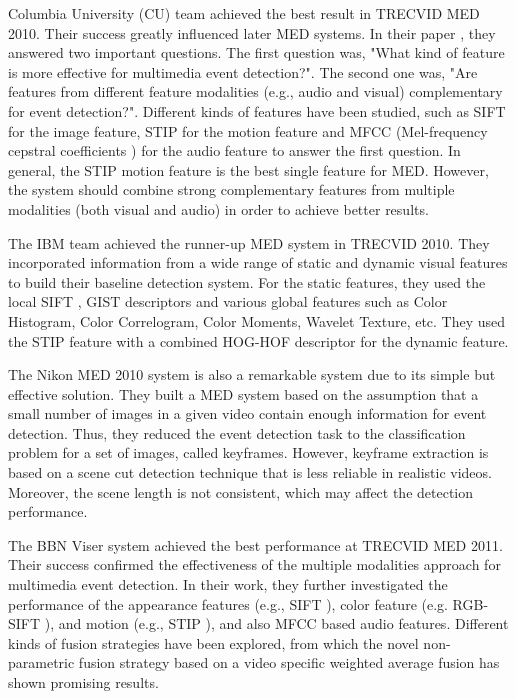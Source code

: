Columbia University (CU) team achieved the best result in TRECVID MED 2010. Their success greatly influenced later MED systems. In their paper \cite{trecvid10:cuucf}, they answered two important questions. The first question was, "What kind of feature is more effective for multimedia event detection?". The second one was, "Are features from different feature modalities (e.g., audio and visual) complementary for event detection?". Different kinds of features have been studied, such as SIFT \cite{lowe2004distinctive} for the image feature, STIP \cite{Laptev:2005:SIP} for the motion feature and MFCC (Mel-frequency cepstral coefficients \cite{Lee1998MFCC}) for the audio feature to answer the first question. In general, the STIP motion feature is the best single feature for MED. However, the system should combine strong complementary features from multiple modalities (both visual and audio) in order to achieve better results. 

The IBM team \cite{trecvid10:IBM} achieved the runner-up MED system in TRECVID 2010. They incorporated information from a wide range of static and dynamic visual features to build their baseline detection system. For the static features, they used the local SIFT \cite{lowe2004distinctive}, GIST \cite{DBLP:livaT01} descriptors and various global features such as Color Histogram, Color Correlogram, Color Moments, Wavelet Texture, etc. They used the STIP \cite{Laptev:2005:SIP} feature with a combined HOG-HOF \cite{Laptev08CVPR} descriptor for the dynamic feature.

The Nikon MED 2010 system \cite{DBLP:conf/trecvid/MatsuoN10} is also a remarkable system due to its simple but effective solution. They built a MED system based on the assumption that a small number of images in a given video contain enough information for event detection. Thus, they reduced the event detection task to the classification problem for a set of images, called keyframes. However, keyframe extraction is based on a scene cut detection technique \cite{Guimaraes:2003} that is less reliable in realistic videos. Moreover, the scene length is not consistent, which may affect the detection performance.

The BBN Viser system \cite{NIST-TRECVID11:BBN-DVMM} achieved the best performance at TRECVID MED 2011. Their success confirmed the effectiveness of the multiple modalities approach for multimedia event detection. In their work, they further investigated the performance of the appearance features (e.g., SIFT \cite{lowe2004distinctive}), color feature (e.g. RGB-SIFT \cite{vandeSandeTPAMI2010}), and motion (e.g., STIP \cite{Laptev:2005:SIP}), and also MFCC \cite{Lee1998MFCC} based audio features. Different kinds of fusion strategies have been explored, from which the novel non-parametric fusion strategy based on a video specific weighted average fusion has shown promising results.

